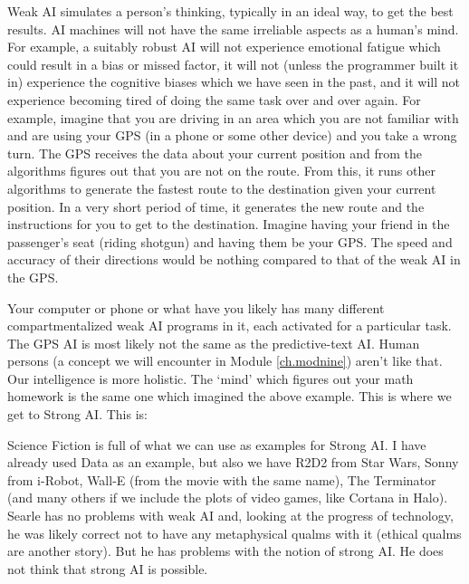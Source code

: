 
Weak AI simulates a person's thinking, typically in an ideal way, to get the best results. AI machines will not have the same irreliable aspects as a human's mind. For example, a suitably robust AI will not experience emotional fatigue which could result in a bias or missed factor, it will not (unless the programmer built it in) experience the cognitive biases which we have seen in the past, and it will not experience becoming tired of doing the same task over and over again. For example, imagine that you are driving in an area which you are not familiar with and are using your GPS (in a phone or some other device) and you take a wrong turn. The GPS receives the data about your current position and from the algorithms figures out that you are not on the route. From this, it runs other algorithms to generate the fastest route to the destination given your current position. In a very short period of time, it generates the new route and the instructions for you to get to the destination. Imagine having your friend in the passenger's seat (riding shotgun) and having them be your GPS. The speed and accuracy of their directions would be nothing compared to that of the weak AI in the GPS.

Your computer or phone or what have you likely has many different compartmentalized weak AI programs in it, each activated for a particular task. The GPS AI is most likely not the same as the predictive-text AI. Human persons (a concept we will encounter in Module \ref{ch.modnine}) aren't like that. Our intelligence is more holistic. The `mind' which figures out your math homework is the same one which imagined the above example. This is where we get to Strong AI. This is:


Science Fiction is full of what we can use as examples for Strong AI. I have already used Data as an example, but also we have R2D2 from Star Wars, Sonny from i-Robot, Wall-E (from the movie with the same name),  The Terminator (and many others if we include the plots of video games, like Cortana in Halo).  Searle has no problems with weak AI and, looking at the progress of technology, he was likely correct not to have any metaphysical qualms with it (ethical qualms are another story).  But he has problems with the notion of strong AI. He does not think that strong AI is possible.

